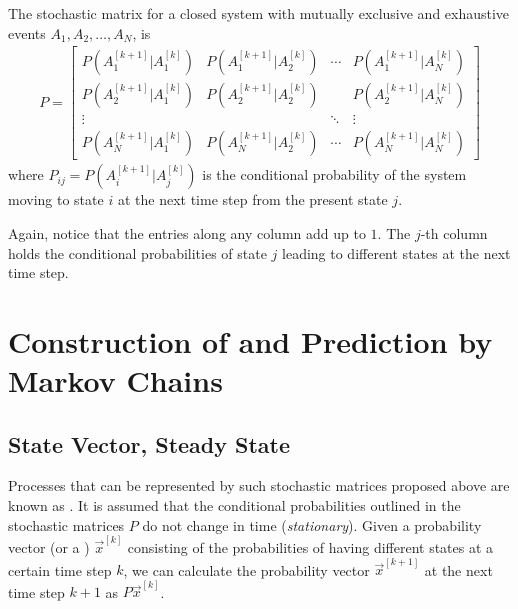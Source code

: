 \begin{defn}
\label{defn:stocmat}
The stochastic matrix for a closed system with mutually exclusive and exhaustive events $A_1, A_2, \ldots, A_N$, is
\begin{align}
P =
\begin{bmatrix}
P(A_1^{[k+1]}|A_1^{[k]}) & P(A_1^{[k+1]}|A_2^{[k]}) & \cdots & P(A_1^{[k+1]}|A_N^{[k]})\\
P(A_2^{[k+1]}|A_1^{[k]}) & P(A_2^{[k+1]}|A_2^{[k]}) & & P(A_2^{[k+1]}|A_N^{[k]}) \\
\vdots & & \ddots & \vdots \\
P(A_N^{[k+1]}|A_1^{[k]}) & P(A_N^{[k+1]}|A_2^{[k]}) & \cdots & P(A_N^{[k+1]}|A_N^{[k]})
\end{bmatrix}
\label{eqn:stocP}
\end{align}
where $P_{ij} = P(A_i^{[k+1]}|A_j^{[k]})$ is the conditional probability of the system moving to state $i$ at the next time step from the present state $j$.
\end{defn}
Again, notice that the entries along any column add up to $1$. The $j$-th column holds the conditional probabilities of state $j$ leading to different states at the next time step.

\section{Construction of and Prediction by Markov Chains}

\subsection{State Vector, Steady State}

Processes that can be represented by such stochastic matrices proposed above are known as . It is assumed that the conditional probabilities outlined in the stochastic matrices $P$ do not change in time (\textit{stationary}). Given a probability vector (or a ) $\vec{x}^{[k]}$ consisting of the probabilities of having different states at a certain time step $k$, we can calculate the probability vector $\vec{x}^{[k+1]}$ at the next time step $k+1$ as $P\vec{x}^{[k]}$.

